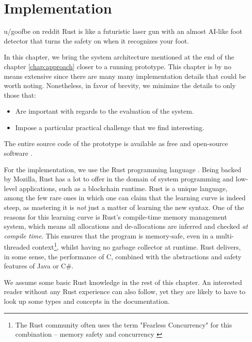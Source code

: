 \chapter{Implementation} \label{chap:impl}

\begin{chapquote}{u/goofbe on reddit}
    Rust is like a futuristic laser gun with an almost AI-like foot detector that turns the safety
    on when it recognizes your foot.
\end{chapquote}

In this chapter, we bring the system architecture mentioned at the end of the chapter
\ref{chap:approach} closer to a running prototype. This chapter is by no means extensive since there
are many many implementation details that could be worth noting. Nonetheless, in favor of brevity,
we minimize the details to only those that:

\begin{itemize}
    \item Are important with regards to the evaluation of the system.
    \item Impose a particular practical challenge that we find interesting.
\end{itemize}

The entire source code of the prototype is available as free and open-source software
\cite{paimaniKianenigmaSubSonic2020}.

For the implementation, we use the Rust programming language
\cite{klabnikRustProgrammingLanguage2019}. Being backed by Mozilla, Rust has a lot to offer in the
domain of system programming and low-level applications, such as a blockchain runtime. Rust is a
unique language, among the few rare ones in which one can claim that the learning curve is indeed
steep, as mastering it is \textit{not} just a matter of learning the new syntax. One of the reasons
for this learning curve is Rust's compile-time memory management system, which means all allocations
and de-allocations are inferred and checked \textit{at compile time}. This ensures that the program
is memory-safe, even in a multi-threaded context\footnote{The Rust community often uses the term
"Fearless Concurrency" for this combination -- memory safety and concurrency
\cite{FearlessConcurrencyRust}}, whilst having no garbage collector at runtime. Rust delivers, in
some sense, the performance of C, combined with the abstractions and safety features of Java or
C\#\cite{jungRustBeltSecuringFoundations2017}.

\begin{remark}
    We assume some basic Rust knowledge in the rest of this chapter. An interested reader without
    any Rust experience can also follow, yet they are likely to have to look up some types and
    concepts in the documentation.
\end{remark}

